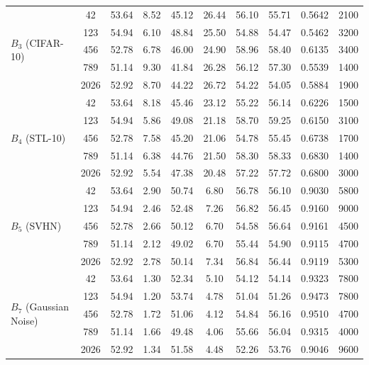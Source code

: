 \documentclass[10pt]{article}
\begin{document}
\begin{table}[!ht]
{\begin{tabular}{l c cc c c cc cc}
\midrule
\multirow{5}{*}{$B_3$ (CIFAR-10)}
 & 42   & 53.64 & 8.52  & 45.12  & 26.44 & 56.10 & 55.71 & 0.5642 & 2100 \\
 & 123  & 54.94 & 6.10  & 48.84  & 25.50 & 54.88 & 54.47 & 0.5462 & 3200 \\
 & 456  & 52.78 & 6.78  & 46.00  & 24.90 & 58.96 & 58.40 & 0.6135 & 3400 \\
 & 789  & 51.14 & 9.30  & 41.84  & 26.28 & 56.12 & 57.30 & 0.5539 & 1400 \\
 & 2026 & 52.92 & 8.70  & 44.22  & 26.72 & 54.22 & 54.05 & 0.5884 & 1900 \\
\midrule
\multirow{5}{*}{$B_4$ (STL-10)}
 & 42   & 53.64 & 8.18  & 45.46  & 23.12 & 55.22 & 56.14 & 0.6226 & 1500 \\
 & 123  & 54.94 & 5.86  & 49.08  & 21.18 & 58.70 & 59.25 & 0.6150 & 3100 \\
 & 456  & 52.78 & 7.58  & 45.20  & 21.06 & 54.78 & 55.45 & 0.6738 & 1700 \\
 & 789  & 51.14 & 6.38  & 44.76  & 21.50 & 58.30 & 58.33 & 0.6830 & 1400 \\
 & 2026 & 52.92 & 5.54  & 47.38  & 20.48 & 57.22 & 57.72 & 0.6800 & 3000 \\
\midrule
\multirow{5}{*}{$B_5$ (SVHN)}
 & 42   & 53.64 & 2.90  & 50.74  & 6.80  & 56.78 & 56.10 & 0.9030 & 5800 \\
 & 123  & 54.94 & 2.46  & 52.48  & 7.26  & 56.82 & 56.45 & 0.9160 & 9000 \\
 & 456  & 52.78 & 2.66  & 50.12  & 6.70  & 54.58 & 56.64 & 0.9161 & 4500 \\
 & 789  & 51.14 & 2.12  & 49.02  & 6.70  & 55.44 & 54.90 & 0.9115 & 4700 \\
 & 2026 & 52.92 & 2.78  & 50.14  & 7.34  & 56.84 & 56.44 & 0.9119 & 5300 \\
\midrule
\multirow{5}{*}{$B_7$ (Gaussian Noise)}
 & 42   & 53.64 & 1.30  & 52.34  & 5.10  & 54.12 & 54.14 & 0.9323 & 7800 \\
 & 123  & 54.94 & 1.20  & 53.74  & 4.78  & 51.04 & 51.26 & 0.9473 & 7800 \\
 & 456  & 52.78 & 1.72  & 51.06  & 4.12  & 54.84 & 56.16 & 0.9510 & 4700 \\
 & 789  & 51.14 & 1.66  & 49.48  & 4.06  & 55.66 & 56.04 & 0.9315 & 4000 \\
 & 2026 & 52.92 & 1.34  & 51.58  & 4.48  & 52.26 & 53.76 & 0.9046 & 9600 \\
\bottomrule
\end{tabular}%
}
\end{table}
\end{document}
